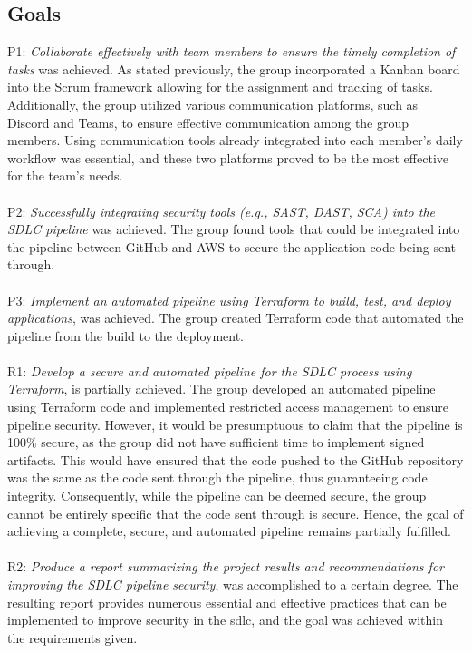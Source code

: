\subsection{Goals}
P1: \textit{Collaborate effectively with team members to ensure the timely completion of tasks} was achieved. As stated previously, the group incorporated a Kanban board into the Scrum framework allowing for the assignment and tracking of tasks. Additionally, the group utilized various communication platforms, such as Discord and Teams, to ensure effective communication among the group members. Using communication tools already integrated into each member's daily workflow was essential, and these two platforms proved to be the most effective for the team's needs. 
\\~\\
P2: \textit{Successfully integrating security tools (e.g., SAST, DAST, SCA) into the SDLC pipeline} was achieved. The group found tools that could be integrated into the pipeline between GitHub and AWS to secure the application code being sent through.
\\~\\
P3: \textit{Implement an automated pipeline using Terraform to build, test, and deploy applications}, was achieved. The group created Terraform code that automated the pipeline from the build to the deployment. 
\\~\\
R1: \textit{Develop a secure and automated pipeline for the SDLC process using Terraform}, is partially achieved. The group developed an automated pipeline using Terraform code and implemented restricted access management to ensure pipeline security. However, it would be presumptuous to claim that the pipeline is 100\% secure, as the group did not have sufficient time to implement signed artifacts. This would have ensured that the code pushed to the GitHub repository was the same as the code sent through the pipeline, thus guaranteeing code integrity. Consequently, while the pipeline can be deemed secure, the group cannot be entirely specific that the code sent through is secure. Hence, the goal of achieving a complete, secure, and automated pipeline remains partially fulfilled. 
\\~\\
R2: \textit{Produce a report summarizing the project results and recommendations for improving the SDLC pipeline security}, was accomplished to a certain degree. The resulting report provides numerous essential and effective practices that can be implemented to improve security in the \acrshort{sdlc}, and the goal was achieved within the requirements given. 


